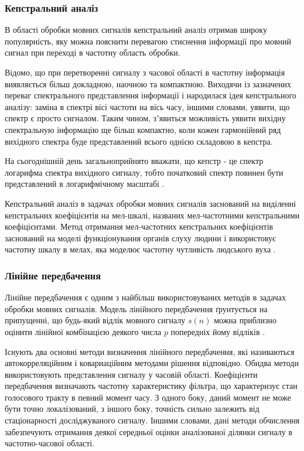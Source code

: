 \subsubsection{Кепстральний аналіз}

В області обробки мовних сигналів кепстральний аналіз отримав широку популярність, яку можна пояснити перевагою стиснення інформації про мовний сигнал при переході в частотну область обробки.

Відомо, що при перетворенні сигналу з часової області в частотну інформація виявляється більш докладною, наочною та компактною. Виходячи із зазначених переваг спектрального представлення інформації і народилася ідея кепстрального аналізу: заміна в спектрі вісі частоти на вісь часу, іншими словами, уявити, що спектр є просто сигналом. Таким чином, зʼявиться можливість уявити вихідну спектральную інформацію ще більш компактно, коли кожен гармонійний ряд вихідного спектра буде представлений всього однією складовою в кепстра.

На сьогоднішній день загальноприйнято вважати, що кепстр - це спектр логарифма спектра вихідного сигналу, тобто початковий спектр повинен бути представлений в логарифмічному масштабі \cite{Козлов_2013}.

Кепстральний аналіз в задачах обробки мовних сигналів заснований на виділенні кепстральних коефіцієнтів на мел-шкалі, названих мел-частотними кепстральними коефіцієнтами. Метод отримання мел-частотних кепстральних коефіцієнтів заснований на моделі функціонування органів слуху людини і використовує частотну шкалу в мелах, яка моделює частотну чутливість людського вуха \cite{Huang_2001}.

\subsubsection{Лінійне передбачення}

Лінійне передбачення є одним з найбільш використовуваних методів в задачах обробки мовних сигналів. Модель лінійного передбачення ґрунтується на припущенні, що будь-який відлік мовного сигналу $s(n)$ можна приблизно оцінити лінійної комбінацією деякого числа $p$ попередніх йому відліків \cite{Любимов_1995}.

Існують два основні методи визначення лінійного передбачення, які називаються автокорреляційним і ковариаційним методами рішення відповідно. Обидва методи використовують представлення сигналу у часовій області. Коефіцієнти передбачення визначають частотну характеристику фільтра, що характеризує стан голосового тракту в певний момент часу. З одного боку, даний момент не може бути точно локалізований, з іншого боку, точність сильно залежить від стаціонарності досліджуваного сигналу. Іншими словами, дані методи обчислення забезпечують отримання деякої середньої оцінки аналізованої ділянки сигналу в частотно-часової області.

